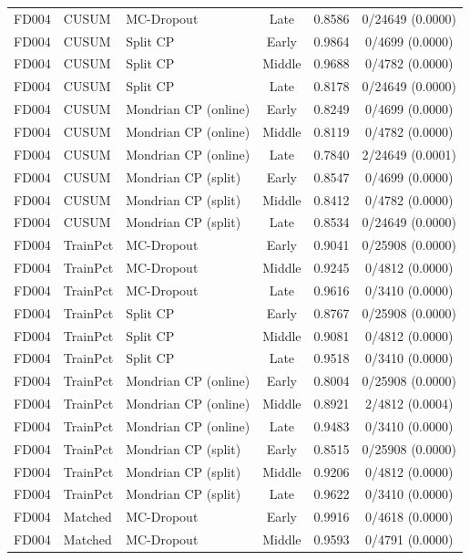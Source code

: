 \begin{table}[t]
\begin{tabular}{lllccc}
FD004 & CUSUM & MC-Dropout & Late & 0.8586 & 0/24649 (0.0000) \\
FD004 & CUSUM & Split CP & Early & 0.9864 & 0/4699 (0.0000) \\
FD004 & CUSUM & Split CP & Middle & 0.9688 & 0/4782 (0.0000) \\
FD004 & CUSUM & Split CP & Late & 0.8178 & 0/24649 (0.0000) \\
FD004 & CUSUM & Mondrian CP (online) & Early & 0.8249 & 0/4699 (0.0000) \\
FD004 & CUSUM & Mondrian CP (online) & Middle & 0.8119 & 0/4782 (0.0000) \\
FD004 & CUSUM & Mondrian CP (online) & Late & 0.7840 & 2/24649 (0.0001) \\
FD004 & CUSUM & Mondrian CP (split) & Early & 0.8547 & 0/4699 (0.0000) \\
FD004 & CUSUM & Mondrian CP (split) & Middle & 0.8412 & 0/4782 (0.0000) \\
FD004 & CUSUM & Mondrian CP (split) & Late & 0.8534 & 0/24649 (0.0000) \\
FD004 & TrainPct & MC-Dropout & Early & 0.9041 & 0/25908 (0.0000) \\
FD004 & TrainPct & MC-Dropout & Middle & 0.9245 & 0/4812 (0.0000) \\
FD004 & TrainPct & MC-Dropout & Late & 0.9616 & 0/3410 (0.0000) \\
FD004 & TrainPct & Split CP & Early & 0.8767 & 0/25908 (0.0000) \\
FD004 & TrainPct & Split CP & Middle & 0.9081 & 0/4812 (0.0000) \\
FD004 & TrainPct & Split CP & Late & 0.9518 & 0/3410 (0.0000) \\
FD004 & TrainPct & Mondrian CP (online) & Early & 0.8004 & 0/25908 (0.0000) \\
FD004 & TrainPct & Mondrian CP (online) & Middle & 0.8921 & 2/4812 (0.0004) \\
FD004 & TrainPct & Mondrian CP (online) & Late & 0.9483 & 0/3410 (0.0000) \\
FD004 & TrainPct & Mondrian CP (split) & Early & 0.8515 & 0/25908 (0.0000) \\
FD004 & TrainPct & Mondrian CP (split) & Middle & 0.9206 & 0/4812 (0.0000) \\
FD004 & TrainPct & Mondrian CP (split) & Late & 0.9622 & 0/3410 (0.0000) \\
FD004 & Matched & MC-Dropout & Early & 0.9916 & 0/4618 (0.0000) \\
FD004 & Matched & MC-Dropout & Middle & 0.9593 & 0/4791 (0.0000) \\

\end{tabular}
\end{table}
